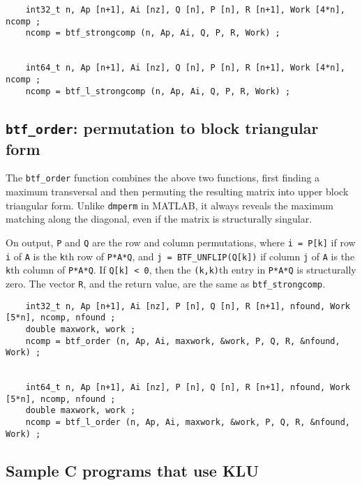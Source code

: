 \documentclass[11pt]{article}
\begin{document}
{\footnotesize
\begin{verbatim}
    int32_t n, Ap [n+1], Ai [nz], Q [n], P [n], R [n+1], Work [4*n], ncomp ;
    ncomp = btf_strongcomp (n, Ap, Ai, Q, P, R, Work) ;


    int64_t n, Ap [n+1], Ai [nz], Q [n], P [n], R [n+1], Work [4*n], ncomp ;
    ncomp = btf_l_strongcomp (n, Ap, Ai, Q, P, R, Work) ;
\end{verbatim}
}

\subsection{{\tt btf\_order}: permutation to block triangular form}


The {\tt btf\_order} function combines the above two functions, first finding a
maximum transversal and then permuting the resulting matrix into upper block
triangular form.  Unlike {\tt dmperm} in MATLAB, it always reveals the maximum
matching along the diagonal, even if the matrix is structurally singular.

On output, {\tt P} and {\tt Q} are the row and column permutations, where
{\tt i = P[k]} if row {\tt i} of {\tt A} is the {\tt k}th row of {\tt P*A*Q},
and {\tt j = BTF\_UNFLIP(Q[k])} if column {\tt j} of {\tt A} is the {\tt k}th
column of {\tt P*A*Q}.  If {\tt Q[k] < 0}, then the {\tt (k,k)}th entry in
{\tt P*A*Q} is structurally zero.  The vector {\tt R}, and the return value,
are the same as {\tt btf\_strongcomp}.

{\footnotesize
\begin{verbatim}
    int32_t n, Ap [n+1], Ai [nz], P [n], Q [n], R [n+1], nfound, Work [5*n], ncomp, nfound ;
    double maxwork, work ;
    ncomp = btf_order (n, Ap, Ai, maxwork, &work, P, Q, R, &nfound, Work) ;


    int64_t n, Ap [n+1], Ai [nz], P [n], Q [n], R [n+1], nfound, Work [5*n], ncomp, nfound ;
    double maxwork, work ;
    ncomp = btf_l_order (n, Ap, Ai, maxwork, &work, P, Q, R, &nfound, Work) ;
\end{verbatim}
}

\subsection{Sample C programs that use KLU}
\end{document}
